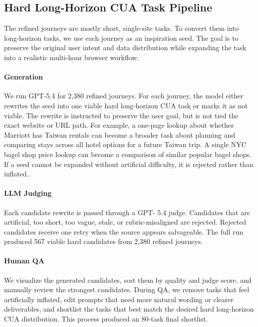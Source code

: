 \documentclass{article}
\theoremstyle{plain}
\theoremstyle{definition}
\theoremstyle{remark}
\begin{document}
\clearpage
\subsection{Hard Long-Horizon CUA Task Pipeline}
  \label{app:hard-longhorizon-cua-pipeline}

  The refined journeys are mostly short, single-site tasks.
  To convert them into long-horizon tasks, we use each
  journey as an inspiration seed. The goal is to preserve the original user intent and data distribution
  while expanding the task into a realistic multi-hour browser
  workflow.

  \paragraph{Generation} We run GPT-5.4 for 2,380 refined journeys.
  For each journey, the model either rewrites the seed into one viable
  hard long-horizon CUA task or marks it as not viable. The rewrite is
  instructed to preserve the user goal, but is not tied the exact website
  or URL path. For example, a one-page lookup about whether Marriott
  has Taiwan rentals can become a broader task about planning and comparing stays across all hotel options for a future
  Taiwan trip. A
  single NYC bagel shop price lookup can become a comparison of similar popular bagel shops. If a seed cannot be expanded
  without artificial difficulty, it is rejected rather than inflated..

  \paragraph{LLM Judging} Each candidate rewrite is passed through a GPT-
  5.4 judge. Candidates that are artificial, too short, too vague, stale, or rubric-misaligned are rejected. Rejected candidates receive one
  retry when the source appears salvageable. The full run produced 567
  viable hard candidates from 2,380 refined journeys.

  \paragraph{Human QA} We visualize the generated candidates, sort
  them by quality and judge score, and manually review the strongest
  candidates. During QA, we remove tasks that feel artificially
  inflated, edit prompts that need more natural wording or clearer
  deliverables, and shortlist the tasks that best match the desired
  hard long-horizon CUA distribution. This process produced an 80-task
  final shortlist.
\end{document}
